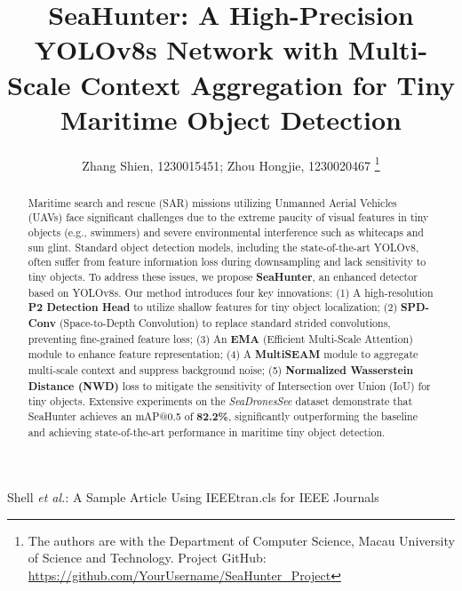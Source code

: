 \documentclass[lettersize,journal]{IEEEtran}
\begin{document}
\title{SeaHunter: A High-Precision YOLOv8s Network with Multi-Scale Context Aggregation for Tiny Maritime Object Detection}

\author{Zhang Shien, 1230015451; Zhou Hongjie, 1230020467
\thanks{The authors are with the Department of Computer Science, Macau University of Science and Technology. Project GitHub: \protect\url{https://github.com/YourUsername/SeaHunter_Project}}}

%
{Shell \MakeLowercase{\textit{et al.}}: A Sample Article Using IEEEtran.cls for IEEE Journals}


\maketitle

\enlargethispage{-6\baselineskip}

\begin{abstract}
Maritime search and rescue (SAR) missions utilizing Unmanned Aerial Vehicles (UAVs) face significant challenges due to the extreme paucity of visual features in tiny objects (e.g., swimmers) and severe environmental interference such as whitecaps and sun glint. Standard object detection models, including the state-of-the-art YOLOv8, often suffer from feature information loss during downsampling and lack sensitivity to tiny objects. To address these issues, we propose \textbf{SeaHunter}, an enhanced detector based on YOLOv8s. Our method introduces four key innovations: (1) A high-resolution \textbf{P2 Detection Head} to utilize shallow features for tiny object localization; (2) \textbf{SPD-Conv} (Space-to-Depth Convolution) to replace standard strided convolutions, preventing fine-grained feature loss; (3) An \textbf{EMA} (Efficient Multi-Scale Attention) module to enhance feature representation; (4) A \textbf{MultiSEAM} module to aggregate multi-scale context and suppress background noise; (5) \textbf{Normalized Wasserstein Distance (NWD)} loss to mitigate the sensitivity of Intersection over Union (IoU) for tiny objects. Extensive experiments on the \textit{SeaDronesSee} dataset demonstrate that SeaHunter achieves an mAP@0.5 of \textbf{82.2\%}, significantly outperforming the baseline and achieving state-of-the-art performance in maritime tiny object detection.
\end{abstract}
\end{document}
